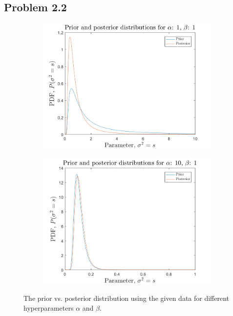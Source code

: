 \documentclass{article}
\begin{document}
\subsection*{Problem 2.2}

\begin{figure}[H]
    \centering
    \begin{subfigure}[b]{0.65\textwidth}
        \centering
        \includegraphics[width=\textwidth]{Figures/plot2_2_a1.png}
    \end{subfigure}
    \begin{subfigure}[b]{0.65\textwidth}
        \centering
        \includegraphics[width=\textwidth]{Figures/plot2_2_a2.png}
    \end{subfigure}
    \caption{\label{fig:distributions} The prior vs. posterior distribution using the given data for different hyperparameters $\alpha$ and $\beta$.}
\end{figure}
\end{document}
